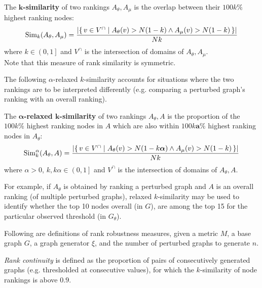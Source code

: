 \begin{definition}[$\bm{k}$-similarity]
    \label{def:k_similarity}
    \vspace*{-2mm}
    The \textbf{$\bm{k}$-similarity} of two rankings $A_\theta, A_\mu$ is the overlap between their $100k\%$ highest ranking nodes:
    \[ \operatorname{Sim}_k(A_\theta, A_\mu) = \frac{\left\lvert \left\{\, v \in V^{\cap} \mid  A_\theta(v) > N(1-k) \wedge A_\mu(v) > N(1-k)  \, \right\} \right\rvert}{Nk} \]
    where $k \in \left( 0, 1 \right]$ and $V^{\cap}$ is the intersection of domains of $A_\theta, A_\mu$.\\
    Note that this measure of rank similarity is symmetric.
\end{definition}

The following $\alpha$-relaxed $k$-similarity accounts for situations where the two rankings are to be interpreted differently (e.g. comparing a perturbed graph's ranking with an overall ranking).

\begin{definition}
    \label{def:alpha_relaxed_k_similarity}
    \vspace*{-2mm}
    The \textbf{$\bm{\alpha}$-relaxed $\bm{k}$-similarity} of two rankings $A_\theta, A$ is the proportion of the $100k\%$ highest ranking nodes in $A$ which are also within $100k\bm{a}\%$ highest ranking nodes in $A_\theta$:
    \[ \operatorname{Sim}_k^\alpha(A_\theta, A) = \frac{\left\lvert \left\{\, v \in V^{\cap} \mid  A_\theta(v) > N(1-k\bm{\alpha}) \wedge A_\mu(v) > N(1-k)  \, \right\} \right\rvert}{Nk} \]
    where $\alpha>0$, $k, k\alpha \in \left( 0, 1 \right]$ and $V^{\cap}$ is the intersection of domains of $A_\theta, A$.
\end{definition}

For example, if $A_\theta$ is obtained by ranking a perturbed graph and $A$ is an overall ranking (of multiple perturbed graphs), relaxed $k$-similarity may be used to identify whether the top 10 nodes overall (in $G$), are among the top 15 for the particular observed threshold (in $G_\theta$).

Following are definitions of rank robustness measures, given a metric $M$, a base graph $G$, a graph generator $\xi$, and the number of perturbed graphs to generate $n$.

\textsl{Rank continuity} is defined as the proportion of pairs of consecutively generated graphs (e.g. thresholded at consecutive values), for which the $k$-similarity of node rankings is above $0.9$.

